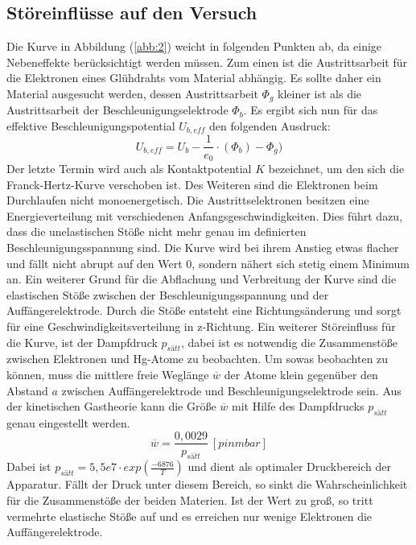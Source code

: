 \subsection{Störeinflüsse auf den Versuch}
Die Kurve in Abbildung (\ref{abb:2}) weicht in folgenden Punkten ab, da einige Nebeneffekte berücksichtigt werden müssen.
Zum einen ist die Austrittsarbeit für die Elektronen eines Glühdrahts vom Material abhängig.
Es sollte daher ein Material ausgesucht werden, dessen Austrittsarbeit $\Phi_g$ kleiner ist als die
Austrittsarbeit der Beschleunigungselektrode $\Phi_b$.
Es ergibt sich nun für das effektive Beschleunigungspotential $U_{b,eff}$ den folgenden Ausdruck:
\begin{equation}
  U_{b,eff} = U_b - \frac{1}{e_0} \cdot (\Phi_b) - \Phi_g)
  \label{eq:4}
\end{equation}
Der letzte Termin wird auch als Kontaktpotential $K$ bezeichnet, um den sich die Franck-Hertz-Kurve verschoben ist.
Des Weiteren sind die Elektronen beim Durchlaufen nicht monoenergetisch.
Die Austrittselektronen besitzen eine Energieverteilung mit verschiedenen Anfangsgeschwindigkeiten.
Dies führt dazu, dass die unelastischen Stöße nicht mehr genau im definierten Beschleunigungsspannung sind.
Die Kurve wird bei ihrem Anstieg etwas flacher und fällt nicht abrupt auf den Wert 0, sondern nähert sich stetig einem Minimum an.
Ein weiterer Grund für die Abflachung und Verbreitung der Kurve sind die elastischen Stöße zwischen der Beschleunigungsspannung
und der Auffängerelektrode. Durch die Stöße entsteht eine Richtungsänderung und sorgt für eine Geschwindigkeitsverteilung in
z-Richtung.
Ein weiterer Störeinfluss für die Kurve, ist der Dampfdruck $p_{sätt}$, dabei ist es notwendig die
Zusammenstöße zwischen Elektronen und Hg-Atome zu beobachten. Um sowas beobachten zu können,
muss die mittlere freie Weglänge $\overline{w}$ der Atome klein gegenüber den Abstand $a$ zwischen Auffängerelektrode und Beschleunigungselektrode
sein.
Aus der kinetischen Gastheorie kann die Größe $\overline{w}$ mit Hilfe des Dampfdrucks $p_{sätt}$
genau eingestellt werden.
\begin{equation}
  \overline{w} = \frac{0,0029}{p_{sätt}} \ [p in mbar]
  \label{eq:5}
\end{equation}
Dabei ist $p_{sätt} = 5,5e7 \cdot exp(\frac{-6876}{T})$ und dient als optimaler Druckbereich der Apparatur.
Fällt der Druck unter diesem Bereich,
so sinkt die Wahrscheinlichkeit für die Zusammenstöße der beiden Materien. Ist der Wert zu groß, so tritt
vermehrte elastische Stöße auf und es erreichen nur wenige Elektronen die Auffängerelektrode.
